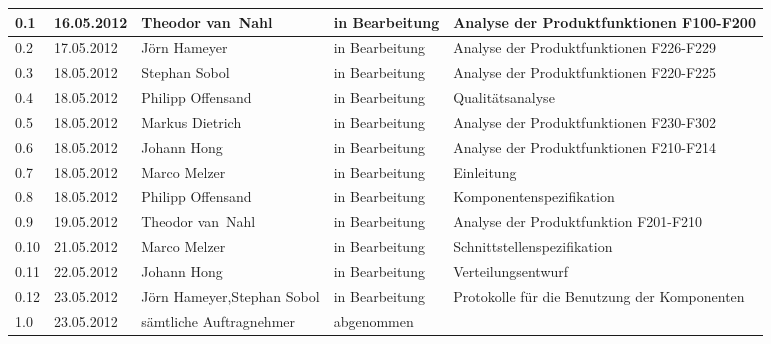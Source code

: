 \begin{longtable}{|m{1.78cm}|m{1.59cm}|m{2.86cm}|m{1.9cm}|m{5.25cm}|}
  0.1   &    16.05.2012    &    Theodor \mbox{van Nahl}    &   in Bearbeitung     &    Analyse der Produktfunktionen F100-F200\\       %
  \hline                                              %
  0.2   &    17.05.2012    &    Jörn Hameyer    &   in Bearbeitung     &    Analyse der Produktfunktionen F226-F229\\       %
  \hline
  0.3   &    18.05.2012    &    Stephan Sobol    &   in Bearbeitung     &    Analyse der Produktfunktionen F220-F225\\       %
  \hline
  0.4   &    18.05.2012    &    Philipp \mbox{Offensand}    &   in Bearbeitung     &    Qualitätsanalyse\\       %
  \hline
  0.5   &    18.05.2012    &    Markus Dietrich    &   in Bearbeitung     &    Analyse der Produktfunktionen F230-F302\\       %
  \hline
  0.6   &    18.05.2012    &    Johann Hong    &   in Bearbeitung     &    Analyse der Produktfunktionen F210-F214\\       %
  \hline
  0.7   &    18.05.2012    &    Marco Melzer    &   in Bearbeitung     &    Einleitung\\       %
  \hline
  0.8   &    18.05.2012    &    Philipp \mbox{Offensand}    &   in Bearbeitung     &    Komponentenspezifikation\\       %
  \hline
  0.9   &    19.05.2012    &    Theodor \mbox{van Nahl}    &   in Bearbeitung     &    Analyse der Produktfunktion F201-F210\\       %
  \hline
  0.10   &   21.05.2012    &    Marco Melzer    &   in Bearbeitung     &    Schnittstellenspezifikation\\       %
  \hline
  0.11   &   22.05.2012    &    Johann Hong    &   in Bearbeitung     &    Verteilungsentwurf\\       %
  \hline
  0.12   &   23.05.2012    &    Jörn Hameyer,\newline Stephan Sobol    &   in Bearbeitung     &    Protokolle für die Benutzung der Komponenten\\       %
  \hline
  1.0   &    23.05.2012    &    sämtliche Auftragnehmer    &   abgenommen     &    \\       %
  \hline
  

\end{longtable}

